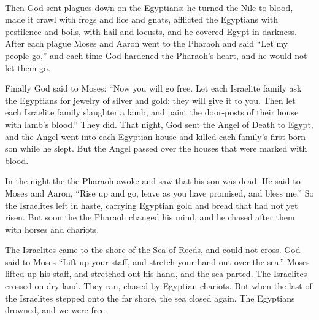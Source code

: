 \documentclass[a4paper,10pt,openany]{memoir}
\newcommand{\HgFill}{\vfill \hrule \vfill}
\newenvironment{HgEnglish}{\strut\\\noindent}{\vspace{1em}}
\begin{document}
\begin{HgEnglish}
  Then God sent plagues down on the Egyptians: 
  he turned the Nile to blood, 
  made it crawl with frogs and lice and gnats, 
  afflicted the Egyptians with pestilence and boils, 
  with hail and locusts, 
  and he covered Egypt in darkness.
  After each plague Moses and Aaron went to the Pharaoh 
  and said ``Let my people go,'' 
  and each time God hardened the Pharaoh's heart, 
  and he would not let them go.

  Finally God said to Moses: 
  ``Now you will go free.
  Let each Israelite family ask the Egyptians
  for jewelry of silver and gold: 
  they will give it to you.
  Then let each Israelite family slaughter a lamb, 
  and paint the door-posts of their house with lamb's blood.'' 
  They did. 
  That night, God sent the Angel of Death to Egypt, 
  and the Angel went into each Egyptian house 
  and killed each family's first-born son while he slept. 
  But the Angel passed over the houses that were marked with blood.

  In the night the the Pharaoh awoke
  and saw that his son was dead. 
  He said to Moses and Aaron,
  ``Rise up and go, leave as you have promised,
  and bless me.''
  So the Israelites left in haste,
  carrying Egyptian gold
  and bread that had not yet risen.
  But soon the the Pharaoh changed his mind, 
  and he chased after them with horses and chariots.

  The Israelites came to the shore of the Sea of Reeds, 
  and could not cross. 
  God said to Moses ``Lift up your staff,
  and stretch your hand out over the sea.'' 
  Moses lifted up his staff, 
  and stretched out his hand,
  and the sea parted. 
  The Israelites crossed on dry land. 
  They ran, chased by Egyptian chariots.
  But when the last of the Israelites stepped onto the far shore, 
  the sea closed again.
  The Egyptians drowned, 
  and we were free.

\end{HgEnglish}

%
\end{document}
